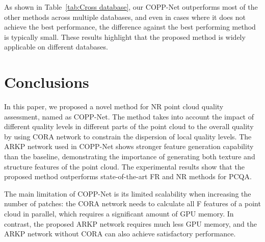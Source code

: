 \documentclass[conference]{IEEEtran}
\begin{document}
As shown in Table~\ref{tab:Cross database}, our COPP-Net outperforms most of the other methods across multiple databases, and even in cases where it does not achieve the best performance, the difference against the best performing method is typically small. These results highlight that the proposed method is widely applicable on different databases.

\section{Conclusions}
In this paper, we proposed a novel method for NR point cloud quality assessment, named as COPP-Net. The method takes into account the impact of different quality levels in different parts of the point cloud to the overall quality by using CORA network to constrain the dispersion of local quality levels. The ARKP network used in COPP-Net shows stronger feature generation capability than the baseline, demonstrating the importance of generating both texture and structure features of the point cloud. The experimental results show that the proposed method outperforms state-of-the-art FR and NR methods for PCQA.

The main limitation of COPP-Net is its limited scalability when increasing the number of patches: the CORA network needs to calculate all F features of a point cloud in parallel, which requires a significant amount of GPU memory. In contrast, the proposed ARKP network requires much less GPU memory, and the ARKP network without CORA can also achieve satisfactory performance.



                  
\end{document}

